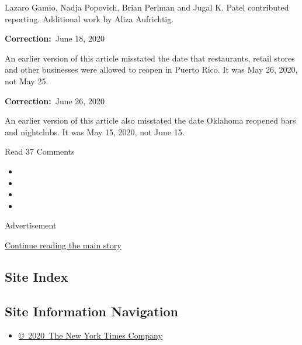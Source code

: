 Lazaro Gamio, Nadja Popovich, Brian Perlman and Jugal K. Patel
contributed reporting. Additional work by Aliza Aufrichtig.

\textbf{Correction:}~June 18, 2020

An earlier version of this article misstated the date that restaurants,
retail stores and other businesses were allowed to reopen in Puerto
Rico. It was May 26, 2020, not May 25.

\textbf{Correction:}~June 26, 2020

An earlier version of this article also misstated the date Oklahoma
reopened bars and nightclubs. It was May 15, 2020, not June 15.

Read 37 Comments

\begin{itemize}
\item
\item
\item
\item
\end{itemize}

Advertisement

\protect\hyperlink{after-bottom}{Continue reading the main story}

\hypertarget{site-index}{%
\subsection{Site Index}\label{site-index}}

\hypertarget{site-information-navigation}{%
\subsection{Site Information
Navigation}\label{site-information-navigation}}

\begin{itemize}
\tightlist
\item
  \href{https://help.nytimes.com/hc/en-us/articles/115014792127-Copyright-notice}{©~2020~The
  New York Times Company}
\end{itemize}

